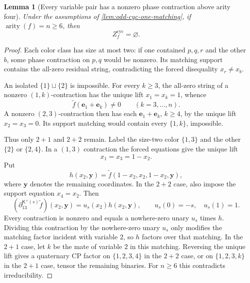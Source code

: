 \documentclass[11pt,letterpaper,onecolumn]{article}
\theoremstyle{plain}
\newtheorem{lemma}[lemma]{Lemma}
\theoremstyle{definition}
\theoremstyle{remark}
\newcommand{\arity}{\operatorname{arity}}
\begin{document}
	\begin{lemma}[Every variable pair has a nonzero phase contraction above arity four]
		\label{lem:odd-cyc-zero-graph-empty}
		Under the assumptions of \cref{lem:odd-cyc-one-matching}, if
		\(\arity(f)=n\ge6\), then
		\[
		Z_f^{\mathrm{cyc}}=\varnothing.
		\]
	\end{lemma}
	
	\begin{proof}
        Each color class has size at most two: if one contained \(p,q,r\)
        and the other \(b\), some phase contraction on \(p,q\) would be
        nonzero. Its matching support contains the all-zero residual string,
        contradicting the forced disequality \(x_r\ne x_b\).
		
		An isolated \(\{1\}\sqcup\{2\}\) is impossible.  For every \(k\ge3\),
		the all-zero string of a nonzero \((1,k)\)-contraction has the unique lift
		\(x_1=x_k=1\), whence
		\begin{equation*}
			\widetilde f({\mathbf e}_1+{\mathbf e}_k)\ne0
			\qquad(k=3,\ldots,n).
		\end{equation*}
		A nonzero \((2,3)\)-contraction then has each \({\mathbf e}_1+{\mathbf e}_k\), \(k\ge4\), by the
		unique lift \(x_2=x_3=0\).  Its support matching would contain every
		\(\{1,k\}\), impossible.
		
		Thus only \(2+1\) and \(2+2\) remain.  Label the size-two color
		\(\{1,3\}\) and the other \(\{2\}\) or \(\{2,4\}\).  In a \((1,3)\)
		contraction the forced equations give the unique lift
		\[
		x_1=x_3=1-x_2.
		\]
		Put
		\[
		h(x_2,\mathbf y)=\widetilde f(1-x_2,x_2,1-x_2,\mathbf y),
		\]
		where \(\mathbf y\) denotes the remaining coordinates. In the \(2+2\)
		case, also impose the support equation \(x_4=x_2\).
		Then
		\begin{equation*}
			(\partial_{13}^{\mathsf K^+(s)}\widetilde f)(x_2,\mathbf y)=u_s(x_2)h(x_2,\mathbf y),
			\qquad
			u_s(0)=-s,\quad u_s(1)=1.
		\end{equation*}
		Every contraction is nonzero and equals a nowhere-zero unary \(u_s\) times \(h\).
		Dividing this contraction by the nowhere-zero unary \(u_s\) only modifies the matching factor incident
		with variable \(2\), so \(h\) factors over that matching. In the \(2+1\) case, let \(k\)
        be the mate of variable \(2\) in this matching. Reversing the unique
		lift gives a quaternary CP factor on \(\{1,2,3,4\}\) in the \(2+2\) case,
		or on \(\{1,2,3,k\}\) in the \(2+1\) case, tensor the remaining binaries.
		For \(n\ge6\) this contradicts irreducibility.
	\end{proof}
	
\end{document}
